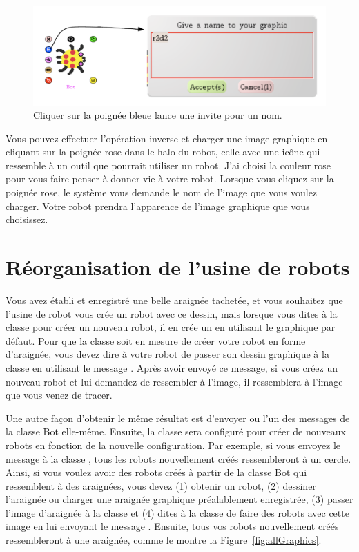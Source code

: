 \documentclass[a4paper,10pt,twoside]{book}
\begin{document}
\begin{figure}[h]
\begin{center}
\includegraphics[width=\textwidth]{nameOfSaveAnnotated}
\end{center}
\caption{Cliquer sur la poign\'ee bleue lance une invite pour un nom.  \label{fig:prompt}}
\end{figure}

Vous pouvez effectuer l'op\'eration inverse et charger une image graphique en cliquant sur la 
poign\'ee rose dans le halo du robot, celle avec une icône qui ressemble \`a un outil que pourrait 
utiliser un robot. J'ai choisi la couleur rose pour vous faire penser \`a donner vie \`a votre robot. 
Lorsque vous cliquez sur la poign\'ee rose, le syst\`eme vous demande le nom de l'image que vous 
voulez charger. Votre robot prendra l'apparence de l'image graphique que vous choisissez.

\section{R\'eorganisation de l'usine de robots}

Vous avez \'etabli et enregistr\'e une belle araign\'ee tachet\'ee, et vous souhaitez que l'usine de robot 
vous cr\'ee un robot avec ce dessin, mais lorsque vous dites \`a la classe  pour cr\'eer un nouveau 
robot, il en cr\'ee un en utilisant le graphique par d\'efaut. Pour que la classe  soit en mesure 
de cr\'eer votre robot en forme d'araign\'ee, vous devez dire \`a votre robot de passer son dessin graphique \`a la classe en utilisant le message 
. Apr\`es avoir envoy\'e ce message, si vous cr\'eez un nouveau robot et lui demandez de 
ressembler \`a l'image, il ressemblera \`a l'image que vous venez de tracer.

Une autre façon d'obtenir le m\^eme r\'esultat est d'envoyer  ou l'un des messages 
 de la classe Bot elle-m\^eme. Ensuite, la classe sera configur\'e pour cr\'eer de nouveaux 
robots en fonction de la nouvelle configuration. Par exemple, si vous envoyez le message 
\`a la classe , tous les robots nouvellement cr\'e\'es ressembleront \`a un cercle. Ainsi, 
si vous voulez avoir des robots cr\'e\'es \`a partir de la classe Bot qui ressemblent \`a des araign\'ees, 
vous devez (1) obtenir un robot, (2) dessiner l'araign\'ee ou charger une araign\'ee graphique 
pr\'ealablement enregistr\'ee, (3) passer l'image d'araign\'ee \`a la classe et (4) dites \`a la classe de 
faire des robots avec cette image en lui envoyant le message . Ensuite, tous vos 
robots nouvellement cr\'e\'es ressembleront \`a une araign\'ee, comme le montre la Figure~\ref{fig:allGraphics}.
\end{document}
